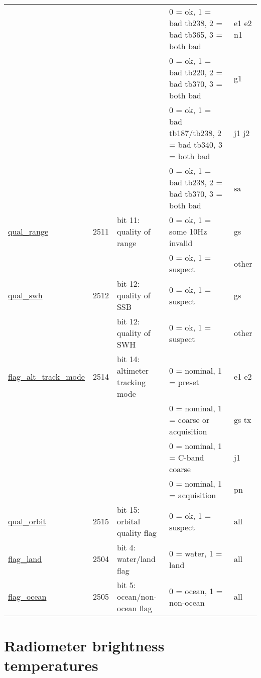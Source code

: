 \documentclass[a4paper,11pt,openany,natbib]{thesis}
\makeatletter
\newcommand\var[1]{\url{#1}\index{variables!#1@\protect\url{#1}}}
\makeatother
\begin{document}
\begin{table}
\begin{sideways}
\begin{tabular}{lrlll}
                         &      & & 0 = ok, 1 = bad tb238, 2 = bad tb365, 3 = both bad & e1 e2 n1 \\
                         &      & & 0 = ok, 1 = bad tb220, 2 = bad tb370, 3 = both bad & g1 \\
                         &      & & 0 = ok, 1 = bad tb187/tb238, 2 = bad tb340, 3 = both bad & j1 j2 \\
                         &      & & 0 = ok, 1 = bad tb238, 2 = bad tb370, 3 = both bad & sa \\
\var{qual_range}         & 2511 & bit 11: quality of range & 0 = ok, 1 = some 10Hz invalid & gs \\
                         &      & & 0 = ok, 1 = suspect & other \\
\var{qual_swh}           & 2512 & bit 12: quality of SSB & 0 = ok, 1 = suspect & gs \\
                         &      & bit 12: quality of SWH & 0 = ok, 1 = suspect & other \\
\var{flag_alt_track_mode}& 2514 & bit 14: altimeter tracking mode & 0 = nominal, 1 = preset & e1 e2 \\  
                         &      & & 0 = nominal, 1 = coarse or acquisition & gs tx \\
                         &      & & 0 = nominal, 1 = C-band coarse & j1 \\
                         &      & & 0 = nominal, 1 = acquisition & pn \\
\var{qual_orbit}         & 2515 & bit 15: orbital quality flag & 0 = ok, 1 = suspect & all \\
\var{flag_land}          & 2504 & bit 4: water/land flag & 0 = water, 1 = land & all \\
\var{flag_ocean}         & 2505 & bit 5: ocean/non-ocean flag & 0 = ocean, 1 = non-ocean & all \\
\hline
\end{tabular}
\end{sideways}
\end{table}


\section{Radiometer brightness temperatures}
\label{var:tb}



\printindex
\end{document}
